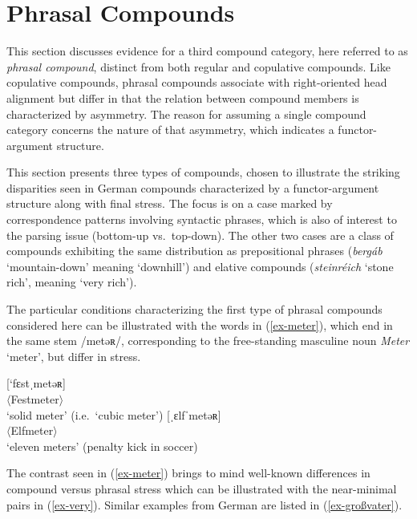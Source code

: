 \documentclass[output=paper
 ,nobabel
 ,draftmode
 ,colorlinks, citecolor=brown
]{langscibook}
\begin{document}
\section{Phrasal Compounds}
\label{sec-phracom}

This section discusses evidence for a third compound category, here referred to as \emph{phrasal compound}, distinct from both regular and copulative compounds. Like copulative compounds, phrasal compounds associate with right-oriented head alignment but differ in that the relation between compound members is characterized by asymmetry. The reason for assuming a single compound category concerns the nature of that asymmetry, which indicates a functor-argument structure. 

This section presents three types of compounds, chosen to illustrate the striking disparities seen in German compounds characterized by a functor-argument structure along with final stress. The focus is on a case marked by correspondence patterns involving syntactic phrases, which is also of interest to the parsing issue (bottom-up vs.\ top-down). The other two cases are a class of compounds exhibiting the same distribution as prepositional phrases (\eg \emph{bergáb} `mountain-down' meaning `downhill') and elative compounds (\eg \emph{steinréich} `stone rich', meaning `very rich').

The particular conditions characterizing the first type of phrasal compounds considered here can be illustrated with the words in (\ref{ex-meter}), which end in the same stem /metəʀ/, corresponding to the free-standing masculine noun \emph{Meter} `meter', but differ in stress. 

\eal\label{ex-meter}
\ex\label{ex-qm} 
[`fɛstˌmetəʀ]\\
$\langle$Festmeter$\rangle$\\
`solid meter' (i.e.\ `cubic meter')
%
%
\ex\label{ex-penalty}
[ˌɛlfˈmetəʀ]\\
$\langle$Elfmeter$\rangle$\\
`eleven meters' (penalty kick in soccer)
\zl

\noindent
The contrast seen in (\ref{ex-meter}) brings to mind well-known differences in compound versus phrasal stress which can be illustrated with the near-minimal pairs in (\ref{ex-very}). Similar examples from German are listed in (\ref{ex-großvater}).
\end{document}
